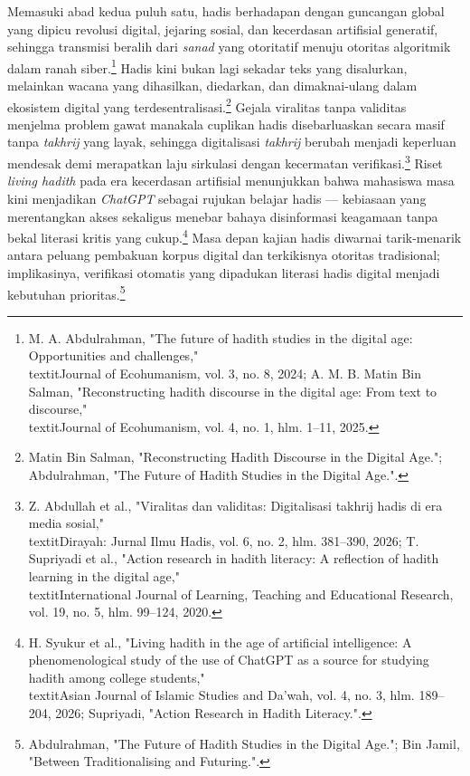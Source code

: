 Memasuki abad kedua puluh satu, hadis berhadapan dengan guncangan global yang dipicu revolusi digital, jejaring sosial, dan kecerdasan artifisial generatif, sehingga transmisi beralih dari \textit{sanad} yang otoritatif menuju otoritas algoritmik dalam ranah siber.\footnote{M. A. Abdulrahman, "The future of hadith studies in the digital age: Opportunities and challenges," \\textit{Journal of Ecohumanism}, vol. 3, no. 8, 2024; A. M. B. Matin Bin Salman, "Reconstructing hadith discourse in the digital age: From text to discourse," \\textit{Journal of Ecohumanism}, vol. 4, no. 1, hlm. 1--11, 2025.} Hadis kini bukan lagi sekadar teks yang disalurkan, melainkan wacana yang dihasilkan, diedarkan, dan dimaknai-ulang dalam ekosistem digital yang terdesentralisasi.\footnote{Matin Bin Salman, "Reconstructing Hadith Discourse in the Digital Age."; Abdulrahman, "The Future of Hadith Studies in the Digital Age.".} Gejala viralitas tanpa validitas menjelma problem gawat manakala cuplikan hadis disebarluaskan secara masif tanpa \textit{takhrij} yang layak, sehingga digitalisasi \textit{takhrij} berubah menjadi keperluan mendesak demi merapatkan laju sirkulasi dengan kecermatan verifikasi.\footnote{Z. Abdullah et al., "Viralitas dan validitas: Digitalisasi takhrij hadis di era media sosial," \\textit{Dirayah: Jurnal Ilmu Hadis}, vol. 6, no. 2, hlm. 381--390, 2026; T. Supriyadi et al., "Action research in hadith literacy: A reflection of hadith learning in the digital age," \\textit{International Journal of Learning, Teaching and Educational Research}, vol. 19, no. 5, hlm. 99--124, 2020.} Riset \textit{living hadith} pada era kecerdasan artifisial menunjukkan bahwa mahasiswa masa kini menjadikan \textit{ChatGPT} sebagai rujukan belajar hadis --- kebiasaan yang merentangkan akses sekaligus menebar bahaya disinformasi keagamaan tanpa bekal literasi kritis yang cukup.\footnote{H. Syukur et al., "Living hadith in the age of artificial intelligence: A phenomenological study of the use of ChatGPT as a source for studying hadith among college students," \\textit{Asian Journal of Islamic Studies and Da'wah}, vol. 4, no. 3, hlm. 189--204, 2026; Supriyadi, "Action Research in Hadith Literacy.".} Masa depan kajian hadis diwarnai tarik-menarik antara peluang pembakuan korpus digital dan terkikisnya otoritas tradisional; implikasinya, verifikasi otomatis yang dipadukan literasi hadis digital menjadi kebutuhan prioritas.\footnote{Abdulrahman, "The Future of Hadith Studies in the Digital Age."; Bin Jamil, "Between Traditionalising and Futuring.".}

